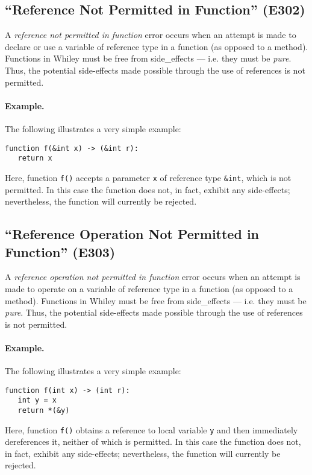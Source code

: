 \subsection{``Reference Not Permitted in Function'' (E302)}

A {\em reference not permitted in function} error occurs when an attempt is made to declare or use a variable of reference type in a function (as opposed to a method).  Functions in Whiley must be free from \glspl{side_effect} --- i.e. they must be {\em pure}.  Thus, the potential side-effects made possible through the use of references is not permitted.

\paragraph{Example.}  The following illustrates a very simple example:

\begin{lstlisting}
function f(&int x) -> (&int r):
   return x
\end{lstlisting}

Here, function \lstinline{f()} accepts a parameter \lstinline{x} of reference type \lstinline{&int}, which is not permitted.  In this case the function does not, in fact, exhibit any side-effects; nevertheless, the function will currently be rejected.

\subsection{``Reference Operation Not Permitted in Function'' (E303)}

A {\em reference operation not permitted in function} error occurs when an attempt is made to operate on a variable of reference type in a function (as opposed to a method).  Functions in Whiley must be free from \glspl{side_effect} --- i.e. they must be {\em pure}.  Thus, the potential side-effects made possible through the use of references is not permitted.

\paragraph{Example.}  The following illustrates a very simple example:

\begin{lstlisting}
function f(int x) -> (int r):
   int y = x
   return *(&y)
\end{lstlisting}

Here, function \lstinline{f()} obtains a reference to local variable \lstinline{y} and then immediately dereferences it, neither of which is permitted.  In this case the function does not, in fact, exhibit any side-effects; nevertheless, the function will currently be rejected.

